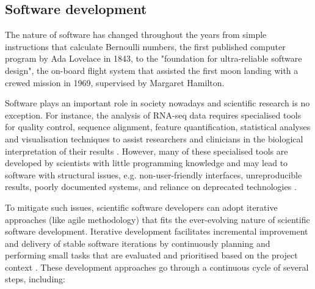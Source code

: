 \subsection{Software development}

The nature of software has changed throughout the years from simple instructions that calculate Bernoulli numbers, the first published computer program by Ada Lovelace in 1843, to the "foundation for ultra-reliable software design", the on-board flight system that assisted the first moon landing with a crewed mission in 1969, supervised by Margaret Hamilton.

Software plays an important role in society nowadays and scientific research is no exception. For instance, the analysis of RNA-seq data requires specialised tools for quality control, sequence alignment, feature quantification, statistical analyses and visualisation techniques to assist researchers and clinicians in the biological interpretation of their results \cite{conesa:2016vw}. However, many of these specialised tools are developed by scientists with little programming knowledge and may lead to software with structural  issues, e.g. non-user-friendly interfaces, unreproducible results, poorly documented systems, and reliance on deprecated technologies \cite{storer:2017tr,silva:2017wl}.


To mitigate such issues, scientific software developers can adopt iterative approaches (like agile methodology) that fits the ever-evolving nature of scientific software development. Iterative development facilitates incremental improvement and delivery of stable software iterations by continuously planning and performing small tasks that are evaluated and prioritised based on the project context \cite{storer:2017tr,silva:2017wl,dyba:2009tc}. These development approaches go through a continuous cycle of several steps, including:

